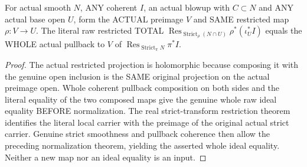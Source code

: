 \begin{lemma}
\label{hir:sharp-actual-raw-total-whole-restricted-open-pullback}
\leanok
For actual smooth $N$, ANY coherent $I$, an actual blowup with $C\subset N$
and ANY actual base open $U$, form the ACTUAL preimage $V$ and SAME
restricted map $\rho:V\to U$. The literal raw restricted TOTAL
$\operatorname{Res}_{\operatorname{Strict}_\rho(N\cap U)}
 \rho^*(\iota_U^*I)$ equals the WHOLE actual pullback to $V$ of
$\operatorname{Res}_{\operatorname{Strict}_\pi N}\pi^*I$.
\end{lemma}
\begin{proof}
The actual restricted projection is holomorphic because composing it with
the genuine open inclusion is the SAME original projection on the actual
preimage open. Whole coherent pullback composition on both sides and the
literal equality of the two composed maps give the genuine whole raw
ideal equality BEFORE normalization. The real strict-transform restriction
theorem identifies the literal local carrier with the preimage of the
original actual strict carrier. Genuine strict smoothness and pullback
coherence then allow the preceding normalization theorem, yielding the
asserted whole ideal equality. Neither a new map nor an ideal equality is
an input.
\end{proof}

